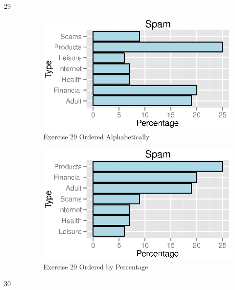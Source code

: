 \documentclass{exam}
\begin{document}
\begin{description}
      \pagebreak

      \item[29]
        \begin{figure}[H]
          \centering
          \includegraphics{figures/ex29a.eps}
          \caption{Exercise 29 Ordered Alphabetically}
        \end{figure}

        \begin{figure}[H]
          \centering
          \includegraphics{figures/ex29b.eps}
          \caption{Exercise 29 Ordered by Percentage}
        \end{figure}

      \item[30]
      \pagebreak
\end{description}
\end{document}
